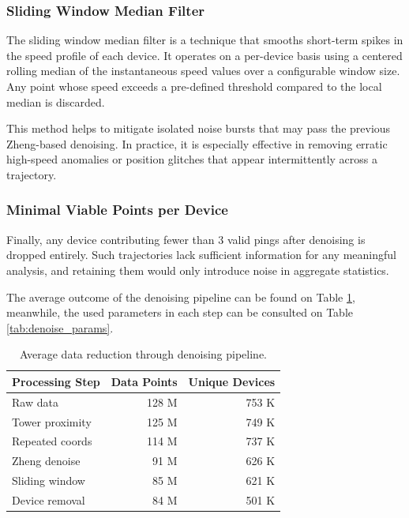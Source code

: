 \documentclass[fleqn,moreauthors,10pt]{ds_report}
\begin{document}
\subsubsection*{Sliding Window Median Filter}
The sliding window median filter is a technique that smooths short-term spikes in the speed profile of each device. It operates on a per-device basis using a centered rolling median of the instantaneous speed values over a configurable window size. Any point whose speed exceeds a pre-defined threshold compared to the local median is discarded. 

This method helps to mitigate isolated noise bursts that may pass the previous Zheng-based denoising. In practice, it is especially effective in removing erratic high-speed anomalies or position glitches that appear intermittently across a trajectory.

\subsubsection*{Minimal Viable Points per Device}

Finally, any device contributing fewer than 3 valid pings after denoising is dropped entirely. Such trajectories lack sufficient information for any meaningful analysis, and retaining them would only introduce noise in aggregate statistics.

The average outcome of the denoising pipeline can be found on Table \ref{tab:data_reduction}, meanwhile, the used parameters in each step can be consulted on Table \ref{tab:denoise_params}. 


\begin{table}[hbt]
    \caption{Average data reduction through denoising pipeline.}
    \centering
    \begin{tabular}{l | r r}
        \toprule
        Processing Step & Data Points & Unique Devices \\
        \midrule
        Raw data & 128 M & 753 K \\
        Tower proximity & 125 M & 749 K \\
        Repeated coords & 114 M & 737 K \\
        Zheng denoise & 91 M & 626 K \\
        Sliding window & 85 M & 621 K \\
        Device removal & 84 M & 501 K \\
        \bottomrule
    \end{tabular}
    \label{tab:data_reduction}
\end{table}
\end{document}
